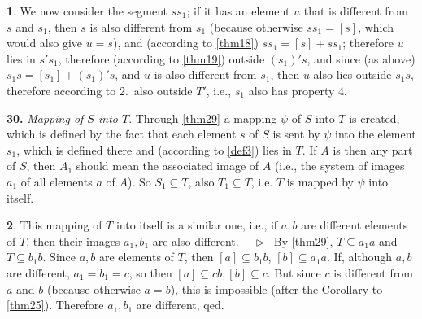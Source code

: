 \documentclass[leqno,hidelinks]{article}
\theoremstyle{definition}
\newtheorem{satz}{\protect\satzname}
\newcommand{\satzname}{}
\renewcommand{\satzname}{\hspace{-4pt}.\ Satz}%
\renewcommand{\satzname}{\hspace{-4pt}.\ Theorem}%
\newcommand\Beweis{\medskip \newline $ \phantom{'.'} \rhd \ $}%
\newcommand{\partof}{\subseteq}
\newcommand{\sref}[1]{\underline{\ref{#1}}}%
\begin{document}
\begin{paracol}{2}
\begin{satz}
We now consider the segment $ss_1$; if it has an element $u$ that is different
from $s$ and $s_1$, then $s$ is also different from $s_1$ (because otherwise
$ss_1 = [s]$, which would also give $u=s$), and (according to \sref{thm18})
$ss_1 = [s] + ss_1$; therefore $u$ lies in $s's_1$, therefore (according to
\sref{thm19}) outside $(s_1)'s$, and since (as above) $s_1s= [s_1] + (s_1)'s$,
and $u$ is also different from $s_1$, then $u$ also lies outside $s_1s$, therefore
according to 2.\ also outside $T'$, i.e., $s_1$ also has property 4.
\end{satz}

\noindent \textbf{30.}\label{thm30} \hspace{-10pt} \emph{Mapping of $S$ into $T$}.
Through \sref{thm29} a mapping $\psi$ of $S$ into $T$ is
created, which is defined by the fact that each element $s$ of $S$ is sent by
$\psi$ into the element $s_1$, which is defined there and (according to \sref{def3})
lies in $T$. If $A$ is then any part of $S$, then $A_1$ should mean the associated
image of $A$ (i.e., the system of images $a_1$ of all elements $a$ of $A$). So
$S_1 \partof T$, also $T_1 \partof T$, i.e. $T$ is mapped by $\psi$ into itself.

\begin{satz}\label{thm31}
This mapping of $T$ into itself is a similar one, i.e., if $a, b$ are different
elements of $T$, then their images $a_1, b_1$ are also different.%
\Beweis
By \sref{thm29}, $T \partof a_1a$ and $T \partof b_1b$. Since $a, b$ are elements
of $T$, then $[a] \partof b_1b$, $[b] \partof a_1a$. If, although $a, b$ are
different, $a_1 = b_1  = c$, so then $[a] \partof cb, [b] \partof c$. But since
$c$ is different from $a$ and $b$ (because otherwise $a = b$), this is impossible
(after the Corollary to \sref{thm25}). Therefore $a_1, b_1$ are different, qed.
\end{satz}

\end{paracol}
\end{document}
